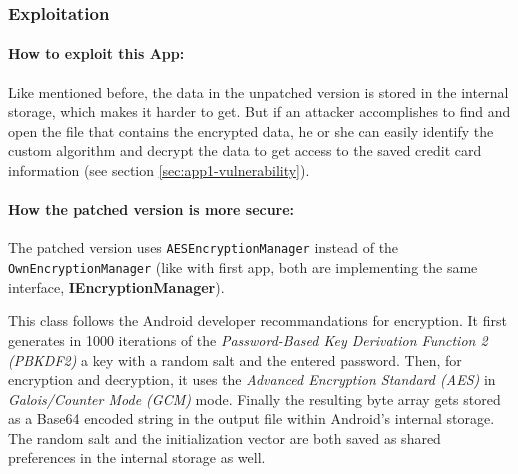 \subsubsection{Exploitation}
\paragraph{How to exploit this App:}
Like mentioned before, the data in the unpatched version is stored in the internal storage, which makes it harder to get. But if an attacker accomplishes to find and open the file that contains the encrypted data, he or she can easily identify the custom algorithm and decrypt the data to get access to the saved credit card information (see section \ref{sec:app1-vulnerability}).


\paragraph{How the patched version is more secure:}
The patched version uses \texttt{AESEncryptionManager} instead of the \texttt{OwnEncryptionManager} (like with first app, both are implementing the same interface, \textbf{IEncryptionManager}).

This class follows the Android developer recommandations for encryption. It first generates in 1000 iterations of the \textit{Password-Based Key Derivation Function 2 (PBKDF2)} a key with a random salt and the entered password. Then, for encryption and decryption, it uses the \textit{Advanced Encryption Standard (AES)} in \textit{Galois/Counter Mode (GCM)} mode. Finally the resulting byte array gets stored as a Base64 encoded string in the output file within Android's internal storage. The random salt and the initialization vector are both saved as shared preferences in the internal storage as well.
